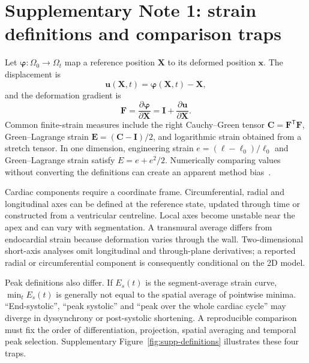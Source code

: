 \documentclass[11pt,a4paper]{article}
\newcommand{\vect}[1]{\bm{#1}}
\begin{document}
\section*{Supplementary Note 1: strain definitions and comparison traps}

Let \(\boldsymbol\varphi:\Omega_0\rightarrow\Omega_t\) map a reference position \(\vect X\) to its deformed position \(\vect x\). The displacement is
\begin{equation}
\vect u(\vect X,t)=\boldsymbol\varphi(\vect X,t)-\vect X,
\end{equation}
and the deformation gradient is
\begin{equation}
\vect F=\frac{\partial\boldsymbol\varphi}{\partial\vect X}=\vect I+\frac{\partial\vect u}{\partial\vect X}.
\end{equation}
Common finite-strain measures include the right Cauchy--Green tensor \(\vect C=\vect F^{\mathsf T}\vect F\), Green--Lagrange strain \(\vect E=(\vect C-\vect I)/2\), and logarithmic strain obtained from a stretch tensor. In one dimension, engineering strain \(e=(\ell-\ell_0)/\ell_0\) and Green--Lagrange strain satisfy \(E=e+e^2/2\). Numerically comparing values without converting the definitions can create an apparent method bias~\cite{wehner2018}.

Cardiac components require a coordinate frame. Circumferential, radial and longitudinal axes can be defined at the reference state, updated through time or constructed from a ventricular centreline. Local axes become unstable near the apex and can vary with segmentation. A transmural average differs from endocardial strain because deformation varies through the wall. Two-dimensional short-axis analyses omit longitudinal and through-plane derivatives; a reported radial or circumferential component is consequently conditional on the 2D model.

Peak definitions also differ. If \(E_s(t)\) is the segment-average strain curve, \(\min_t E_s(t)\) is generally not equal to the spatial average of pointwise minima. ``End-systolic'', ``peak systolic'' and ``peak over the whole cardiac cycle'' may diverge in dyssynchrony or post-systolic shortening. A reproducible comparison must fix the order of differentiation, projection, spatial averaging and temporal peak selection. Supplementary Figure~\ref{fig:supp-definitions} illustrates these four traps.
\end{document}
